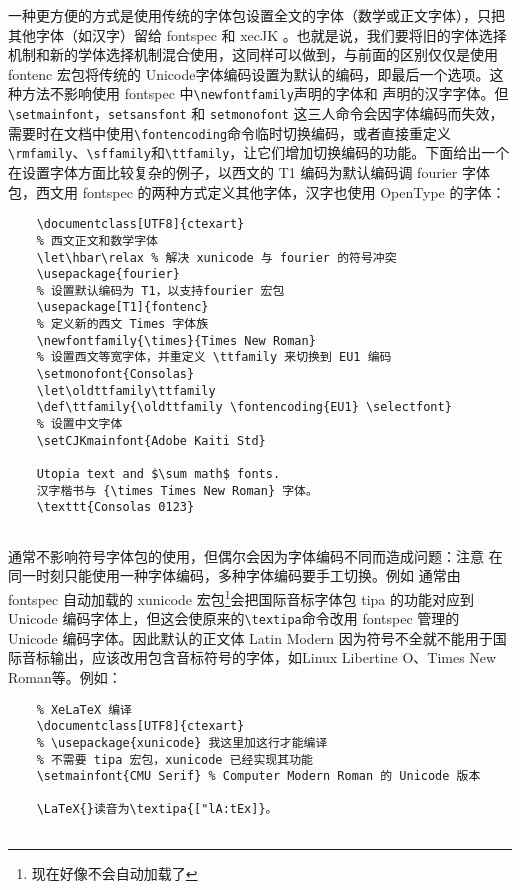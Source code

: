 一种更方便的方式是使用传统的字体包设置全文的字体（数学或正文字体），只把其他字体（如汉字）留给 fontspec 和 xecJK 。也就是说，我们要将旧的字体选择机制和新的学体选择机制混合使用，这同样可以做到，与前面的区别仅仅是使用 fontenc 宏包将传统的 Unicode字体编码设置为默认的编码，即最后一个选项。这种方法不影响使用 fontspec 中\verb|\newfontfamily|声明的字体和 \XeTeX 声明的汉字字体。但 \verb|\setmainfont|，\verb|setsansfont| 和 \verb|setmonofont| 这三人命令会因字体编码而失效，需要时在文档中使用\verb|\fontencoding|命令临时切换编码，或者直接重定义\verb|\rmfamily|、\verb|\sffamily|和\verb|\ttfamily|，让它们增加切换编码的功能。下面给出一个在设置字体方面比较复杂的例子，以西文的 T1 编码为默认编码调 fourier 字体包，西文用 fontspec 的两种方式定义其他字体，汉字也使用 OpenType 的字体：
\begin{lstlisting}
    \documentclass[UTF8]{ctexart}
    % 西文正文和数学字体
    \let\hbar\relax % 解决 xunicode 与 fourier 的符号冲突
    \usepackage{fourier}
    % 设置默认编码为 T1，以支持fourier 宏包
    \usepackage[T1]{fontenc}
    % 定义新的西文 Times 字体族
    \newfontfamily{\times}{Times New Roman}
    % 设置西文等宽字体，并重定义 \ttfamily 来切换到 EU1 编码
    \setmonofont{Consolas}
    \let\oldttfamily\ttfamily
    \def\ttfamily{\oldttfamily \fontencoding{EU1} \selectfont}
    % 设置中文字体
    \setCJKmainfont{Adobe Kaiti Std}
    
    Utopia text and $\sum math$ fonts.
    汉字楷书与 {\times Times New Roman} 字体。
    \texttt{Consolas 0123}
    
\end{lstlisting}

\XeTeX 通常不影响符号字体包的使用，但偶尔会因为字体编码不同而造成问题：注意 \XeTeX 在同一时刻只能使用一种字体编码，多种字体编码要手工切换。例如
通常由 fontspec 自动加载的 xunicode 宏包\footnote{现在好像不会自动加载了}会把国际音标字体包 tipa 的功能对应到 Unicode 编码字体上，但这会使原来的\verb|\textipa|命令改用 fontspec 管理的 Unicode 编码字体。因此默认的正文体 Latin Modern 因为符号不全就不能用于国际音标输出，应该改用包含音标符号的字体，如Linux Libertine O、Times New Roman等。例如：

\begin{lstlisting}
    % XeLaTeX 编译
    \documentclass[UTF8]{ctexart}
    % \usepackage{xunicode} 我这里加这行才能编译
    % 不需要 tipa 宏包，xunicode 已经实现其功能
    \setmainfont{CMU Serif} % Computer Modern Roman 的 Unicode 版本
    
    \LaTeX{}读音为\textipa{["lA:tEx]}。
    
\end{lstlisting}

